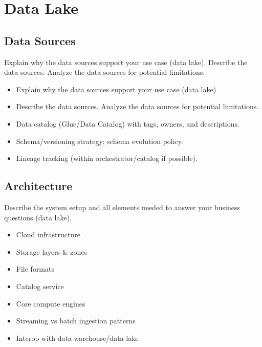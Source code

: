 \cleardoublepage%
\chapter{\label{chap:dl}Data Lake}%





\section{\label{sec:dl_data}Data Sources}

Explain why the data sources support your use case (data lake). Describe the data sources. Analyze the data sources for potential limitations. 




\begin{itemize}
\item Explain why the data sources support your use case (data lake)
\item Describe the data sources. Analyze the data sources for potential limitations. 
\item Data catalog (Glue/Data Catalog) with tags, owners, and descriptions. 
\item Schema/versioning strategy; schema evolution policy. 
\item Lineage tracking (within orchestrator/catalog if possible).

\end{itemize}

\section{\label{sec:dl_architecture}Architecture}

Describe the system setup and all elements needed to answer your business questions (data lake).


\begin{itemize}
\item Cloud infrastructure 
\item Storage layers \& zones
\item File formats 
\item Catalog service 
\item Core compute engines
\item Streaming vs batch ingestion patterns 
\item Interop with data warehouse/data lake

\end{itemize}